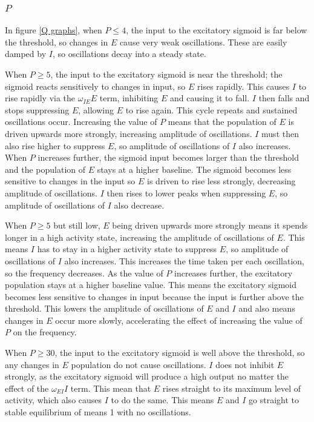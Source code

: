 \documentclass[10pt]{article}
\begin{document}
\begin{flushleft}
\subsubsection{$P$}

In figure \ref{Q graphs}, when $P \leq 4$, the input to the excitatory sigmoid is far below the threshold, so changes in $E$ cause very weak oscillations. These are easily damped by $I$, so oscillations decay into a steady state.

When $P \geq 5$, the input to the excitatory sigmoid is near the threshold; the sigmoid reacts sensitively to changes in input, so $E$ rises rapidly. This causes $I$ to rise rapidly via the $\omega_{IE}E$ term, inhibiting $E$ and causing it to fall. $I$ then falls and stops suppressing $E$, allowing $E$ to rise again. This cycle repeats and sustained oscillations occur. Increasing the value of $P$ means that the population of $E$ is driven upwards more strongly, increasing amplitude of oscillations. $I$ must then also rise higher to suppress $E$, so amplitude of oscillations of $I$ also increases. When $P$ increases further, the sigmoid input becomes larger than the threshold and the population of $E$ stays at a higher baseline. The sigmoid becomes less sensitive to changes in the input so $E$ is driven to rise less strongly, decreasing amplitude of oscillations. $I$ then rises to lower peaks when suppressing $E$, so amplitude of oscillations of $I$ also decrease.
\newline

When $P \geq 5$ but still low, $E$ being driven upwards more strongly means it spends longer in a high activity state, increasing the amplitude of oscillations of $E$. This means $I$ has to stay in a higher activity state to suppress $E$, so amplitude of oscillations of $I$ also increases. This increases the time taken per each oscillation, so the frequency decreases. As the value of $P$ increases further, the excitatory population stays at a higher baseline value. This means the excitatory sigmoid becomes less sensitive to changes in input because the input is further above the threshold. This lowers the amplitude of oscillations of $E$ and $I$ and also means changes in $E$ occur more slowly, accelerating the effect of increasing the value of $P$ on the frequency.
\newline

When $P \geq 30$, the input to the excitatory sigmoid is well above the threshold, so any changes in $E$ population do not cause oscillations. $I$ does not inhibit $E$ strongly, as the excitatory sigmoid will produce a high output no matter the effect of the $\omega_{EI} I$ term. This mean that $E$ rises straight to its maximum level of activity, which also causes $I$ to do the same. This means $E$ and $I$ go straight to stable equilibrium of means 1 with no oscillations.



\end{flushleft}
\end{document}
